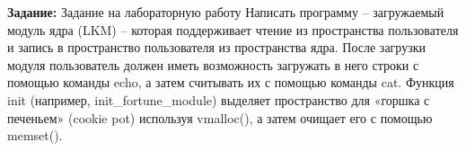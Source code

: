 \Introduction

\textbf{Задание:}
Задание на лабораторную работу
Написать программу – загружаемый модуль ядра (LKM) – которая поддерживает чтение из пространства пользователя и запись в пространство пользователя из пространства ядра.
После загрузки модуля пользователь должен иметь возможность загружать в него строки с помощью команды echo, а затем считывать их с помощью команды cat.
Функция init (например, init\_fortune\_module) выделяет пространство для «горшка с печеньем» (cookie pot) используя vmalloc(), а затем очищает его с помощью memset().
